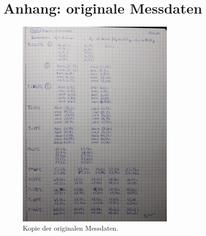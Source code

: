 \newpage
\section*{Anhang: originale Messdaten}
\label{sec:Anhang}
\begin{figure}
    \centering
    \caption{Kopie der originalen Messdaten.}
    \includegraphics[width=0.7\textwidth]{plots/Kopie.jpeg}
\end{figure}